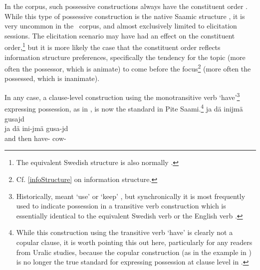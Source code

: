 In the corpus, such possessive constructions always have the constituent order 
\PLUS{}\PLUS{}. 
While this type of possessive construction is the native Saamic structure \citep[9]{Bergsland1977}, it is very uncommon in the \PS\ corpus, and almost exclusively limited to elicitation sessions. The elicitation scenario may have had an effect on the constituent order,\footnote{The equivalent Swedish structure is also normally .} 
but it is more likely the case that the constituent order reflects information structure preferences, specifically the tendency for the topic (more often the possessor, which is animate) to come before the focus\footnote{Cf. \SEC\ref{infoStructure} on information structure.} 
(more often the possessed, which is inanimate). 

In any case, a clause-level construction using the monotransitive verb  ‘have’\footnote{Historically,  meant ‘use’ or ‘keep’ \citep[cf.][10]{Lehtiranta2001}, but synchronically it is most frequently used to indicate possession in a transitive verb construction which is essentially identical to the equivalent Swedish verb  or the English verb .} 
expressing possession, as in , is now the standard in Pite Saami.\footnote{While this construction using the transitive verb  ‘have’ is clearly not a copular clause, it is worth pointing this out here, particularly for any readers from Uralic studies, because the copular construction (as in the example in ) is no longer the true standard for expressing possession at clause level in \PS.}
\ea\label{copula7}
\glll	ja dä inijmä gusajd \\
	ja dä ini-jmä gusa-jd \\
	and then have- cow-\\\nopagebreak
{} 
\z
{}

